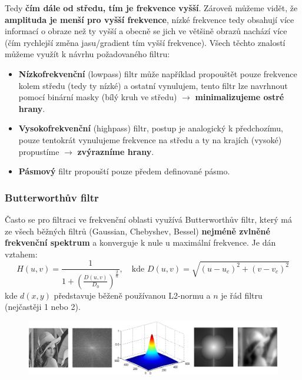 Tedy \textbf{čím dále od středu, tím je frekvence vyšší}. Zároveň můžeme vidět, že \textbf{amplituda je menší pro vyšší frekvence}, nízké frekvence tedy obsahují více informací o obraze než ty vyšší a obecně se jich ve většině obrazů nachází více (čím rychlejší změna jasu/gradient tím vyšší frekvence). Všech těchto znalostí můžeme využít k návrhu požadovaného filtru:
\begin{itemize}
\item \textbf{Nízkofrekvenční} (lowpass) filtr může například propouštět pouze frekvence kolem středu (tedy ty nízké) a ostatní vynulujem, tento filtr lze navrhnout pomocí binární masky (bílý kruh ve středu) $\rightarrow$ \textbf{minimalizujeme ostré hrany}.
\item \textbf{Vysokofrekvenční} (highpass) filtr, postup je analogický k předchozímu, pouze tentokrát vynulujeme frekvence na středu a ty na krajích (vysoké) propustíme $\rightarrow$ \textbf{zvýrazníme hrany}.
\item \textbf{Pásmový} filtr propouští pouze předem definované pásmo.
\end{itemize}

\subsubsection{Butterworthův filtr}
Často se pro filtraci ve frekvenční oblasti využívá Butterworthův filtr, který má ze všech běžných filtrů (Gaussian, Chebyshev, Bessel) \textbf{nejméně zvlněné frekvenční spektrum} a konverguje k nule u maximální frekvence. Je dán vztahem:
\begin{equation*}
H(u, v) = \frac{1}{1 + \left( \frac{D(u, v)}{D_0} \right)^{\frac{2}{n}}}, \quad \textrm{kde } D(u, v)=\sqrt{(u - u_c)^2 + (v - v_c)^2}
\end{equation*}
kde $d(x, y)$ představuje běženě používanou L2-normu a $n$ je řád filtru (nejčastěji 1 nebo 2).

\begin{figure}[H]
	\centering
	\includegraphics[width=\textwidth]{assets/7_ftt_filtery}
\end{figure}